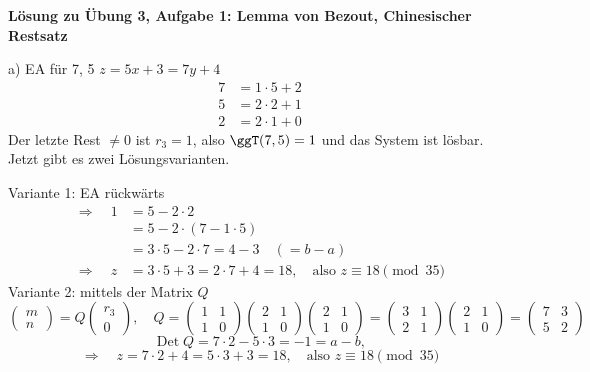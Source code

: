 \textbf{Lösung zu Übung 3, Aufgabe 1: Lemma von Bezout, Chinesischer Restsatz}

\begin{loesung}
a) EA für 7, 5 \qquad $z = 5x + 3 = 7y + 4$
\begin{align*}
7 &= 1 \cdot 5 + 2\\
5 &= 2 \cdot 2 + 1\\
2 &= 2 \cdot 1 + 0
\end{align*}
Der letzte Rest $\neq 0$ ist $r_3 = 1$, also $\ggT(7, 5) = 1$ und das System ist lösbar. Jetzt gibt es zwei Lösungsvarianten.

Variante 1: EA rückwärts
\begin{align*}
\Rightarrow\quad 1 &= 5 - 2 \cdot 2\\
&= 5 - 2 \cdot (7 - 1 \cdot 5)\\
&= 3 \cdot 5 - 2 \cdot 7 = 4 - 3 \quad (= b - a)\\
\Rightarrow\quad z &= 3 \cdot 5 + 3 = 2 \cdot 7 + 4 = 18, \quad \text{also } z \equiv 18 \pmod{35}
\end{align*}
Variante 2: mittels der Matrix $Q$
\[
\begin{pmatrix} m \\ n \end{pmatrix} = Q \begin{pmatrix} r_3 \\ 0 \end{pmatrix}, \quad
Q = \begin{pmatrix} 1 & 1 \\ 1 & 0 \end{pmatrix}\begin{pmatrix} 2 & 1 \\ 1 & 0 \end{pmatrix}\begin{pmatrix} 2 & 1 \\ 1 & 0 \end{pmatrix}
= \begin{pmatrix} 3 & 1 \\ 2 & 1 \end{pmatrix}\begin{pmatrix} 2 & 1 \\ 1 & 0 \end{pmatrix}
= \begin{pmatrix} 7 & 3 \\ 5 & 2 \end{pmatrix}
\]
\[
\operatorname{Det} Q = 7 \cdot 2 - 5 \cdot 3 = -1 = a - b,
\]
\[
\Rightarrow\quad z = 7 \cdot 2 + 4 = 5 \cdot 3 + 3 = 18, \quad \text{also } z \equiv 18 \pmod{35}
\]


\end{loesung}
